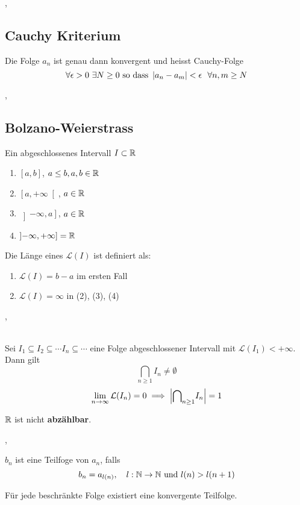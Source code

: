 \sep 

\subsection{Cauchy Kriterium}

 Die Folge $a_{n}$ ist genau dann konvergent und heisst Cauchy-Folge
\[
\forall \epsilon > 0 \ \exists N \geq 0 \text{ so dass } \left\lvert a_{n} - a_{m} \right\rvert  < \epsilon \ \ \forall n, m \geq N
\]

\sep

\subsection{Bolzano-Weierstrass}

\Def[2.5.1] Ein abgeschlossenes Intervall $I \subset \mathbb{R}$ 
\begin{enumerate}
\item[1)] $\left[ a, b \right]$, $a \leq b, a, b \in \mathbb{R}$
\item[2)] $\left[ a, +\infty \right[$, $a \in \mathbb{R}$
\item[3)] $\left] -\infty, a \right]$, $a \in \mathbb{R}$
\item[4)] $\left] -\infty, +\infty \right] = \mathbb{R}$
\end{enumerate}

Die Länge eines $\mathcal{L}(I)$ ist definiert als:
\begin{enumerate} 
\item[•] $\mathcal{L}(I) = b - a$   \quad im ersten Fall
\item[•] $\mathcal{L}(I) = \infty$  \qquad in (2), (3), (4)
\end{enumerate}
\sep

\\ Sei ${I_{1} \subseteq I_{2} \subseteq \cdots I_{n} \subseteq \cdots}$ eine Folge abgeschlossener Intervall mit $\mathcal{L}(I_{1}) < +\infty$. Dann gilt
\[ {\bigcap}_{n\geq1} I_{n} \neq \emptyset \]
\[ \lim\limits_{n \rightarrow \infty} \mathcal{L}(I_{n}) = 0 \implies \left\lvert {\bigcap}_{n\geq1} I_{n} \right\rvert = 1\]

\Satz[2.5.6] $\mathbb{R}$ ist nicht \textbf{abzählbar}.

\sep

\Def[2.5.7] $b_{n}$ ist eine Teilfoge von $a_{n}$, falls 
\[b_{n} = a_{l(n)}, \quad l : \mathbb{N}\rightarrow \mathbb{N}\text{ und } l(n) > l(n + 1) \]

 Für jede beschränkte Folge existiert eine konvergente Teilfolge.


